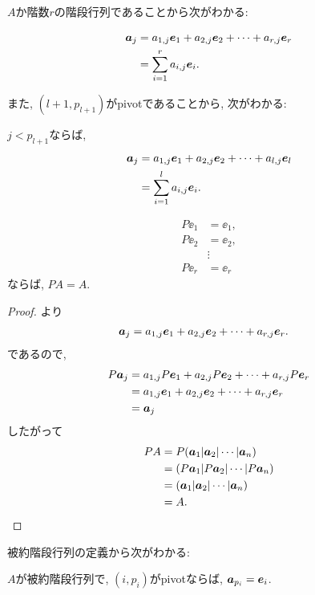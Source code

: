 $A$か階数$r$の階段行列であることから次がわかる:
\begin{lemma}
  \label{lem:3}
  \begin{align*}
    \boldsymbol{a}_{j}&=a_{1,j}\boldsymbol{e}_1+a_{2,j}\boldsymbol{e}_2+\cdots+a_{r,j}\boldsymbol{e}_r\\
    &=\sum_{i=1}^r a_{i,j}\boldsymbol{e}_i.
  \end{align*}
\end{lemma}
また, $(l+1,p_{l+1})$がpivotであることから, 次がわかる:
\begin{lemma}
  \label{lem:4}
  $j<p_{l+1}$ならば,
  \begin{align*}
    \boldsymbol{a}_{j}&=a_{1,j}\boldsymbol{e}_1+a_{2,j}\boldsymbol{e}_2+\cdots+a_{l,j}\boldsymbol{e}_l\\
    &=\sum_{i=1}^l a_{i,j}\boldsymbol{e}_i.
  \end{align*}
\end{lemma}


\begin{lemma}
  \label{lem:5}
    \begin{align*}
    P\ee_1&=\ee_1,\\
    P\ee_2&=\ee_2,\\
    &\vdots\\
    P\ee_{r}&=\ee_{r}
  \end{align*}
  ならば, $PA=A$.
\end{lemma}
\begin{proof}
  より
  \begin{align*}
    \boldsymbol{a}_{j}&=a_{1,j}\boldsymbol{e}_1+a_{2,j}\boldsymbol{e}_2+\cdots+a_{r,j}\boldsymbol{e}_r.
  \end{align*}
  であるので,
  \begin{align*}
    P\boldsymbol{a}_{j}
    &=a_{1,j}P\boldsymbol{e}_1+a_{2,j}P\boldsymbol{e}_2+\cdots+a_{r,j}P\boldsymbol{e}_r\\
    &=a_{1,j}\boldsymbol{e}_1+a_{2,j}\boldsymbol{e}_2+\cdots+a_{r,j}\boldsymbol{e}_r\\
    &=\boldsymbol{a}_j
  \end{align*}
  したがって
  \begin{align*}
    PA&=P(\boldsymbol{a}_1|\boldsymbol{a}_2|\cdots|\boldsymbol{a}_n)\\
    &=(P\boldsymbol{a}_1|P\boldsymbol{a}_2|\cdots|P\boldsymbol{a}_n)\\
    &=(\boldsymbol{a}_1|\boldsymbol{a}_2|\cdots|\boldsymbol{a}_n)\\
    &=A.
  \end{align*}
\end{proof}

 被約階段行列の定義から次がわかる:
\begin{lemma}
  \label{lem:6}
  $A$が被約階段行列で,
  $(i,p_i)$がpivotならば,
  $\boldsymbol{a}_{p_i}=\boldsymbol{e}_i$.
\end{lemma}

